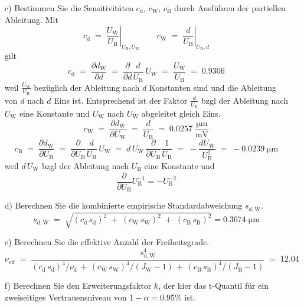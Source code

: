\begin{itemize}
\item[c)] Bestimmen Sie die Sensitivitäten $c_\mathrm{d}$, $c_\mathrm{W}$, $c_\mathrm{B}$ durch Ausführen der
partiellen Ableitung.
Mit 
\begin{equation*}
c_\mathrm{d} \; = \; \left. \frac{U_\mathrm{W}}{U_\mathrm{B}} \right|_{\bar U_\mathrm{B}, \bar U_\mathrm{W}} \qquad
c_\mathrm{W} \; = \; \left. \frac{d}{U_\mathrm{B}} \right|_{\bar U_\mathrm{B}, \bar d}
\end{equation*}
gilt
$$
c_\mathrm{d} \; = \; \frac{\partial d_\mathrm{W}}{\partial d}
\; = \; \frac{\partial}{\partial d} \frac{d}{U_\mathrm{B}} \, U_\mathrm{W}
\; = \; \frac{U_\mathrm{W}}{U_\mathrm{B}} \; =  \; 0.9306
$$
weil $\frac{U_\mathrm{W}}{U_\mathrm{B}}$ bezüglich der Ableitung nach $d$ Konstanten sind und die Ableitung von $d$
nach $d$ Eins ist. Entsprechend ist der Faktor $\frac{d}{U_\mathrm{B}}$ bzgl der Ableitung nach $U_\mathrm{W}$ eine
Konstante und $U_\mathrm{W}$ nach $U_\mathrm{W}$ abgeleitet gleich Eins.
$$
c_\mathrm{W} \; = \; \frac{\partial d_\mathrm{W}}{\partial U_\mathrm{W}} \; = \; \frac{d}{U_\mathrm{B}} \; = \;  0.0257 \; \frac{\mathrm{\mu m}}{\mathrm{mV}}
$$
$$
c_\mathrm{B} \; = \; \frac{\partial d_\mathrm{W}}{\partial U_\mathrm{B}}
\; = \; \frac{\partial}{\partial U_\mathrm{B}} \frac{d}{U_\mathrm{B}} \, U_\mathrm{W}
\; = \; d \, U_\mathrm{W} \, \frac{\partial}{\partial U_\mathrm{B}} \frac{1}{U_\mathrm{B}}
\; = \; -\frac{d U_\mathrm{W}}{U_\mathrm{B}^2} \; = \;  -0.0239 \; \mathrm{\mu m}
$$
weil $d \, U_\mathrm{W}$ bzgl der Ableitung nach $U_\mathrm{B}$ eine Konstante und
$$
 \frac{\partial}{\partial U_\mathrm{B}} U_\mathrm{B}^{-1} = -U_\mathrm{B}^{-2}
$$
\item[d)] Berechnen Sie die kombinierte empirische Standardabweichung $s_{d,\mathrm{W}}$.
$$
s_{\mathrm{d},\mathrm{W}} \; = \; \sqrt{(c_\mathrm{d} \, s_\mathrm{d})^2 \; + \; (c_\mathrm{W} \, s_\mathrm{W})^2 \; + \; (c_\mathrm{B} \, s_\mathrm{B})^2} =    0.3674 \; \mathrm{\mu m}
$$
\item[e)] Berechnen Sie die effektive Anzahl der Freiheitsgrade.
$$
\nu_\mathrm{eff} \; = \; \frac{s_{\mathrm{d},\mathrm{W}}^4}{(c_\mathrm{d} \, s_\mathrm{d})^4/\nu_\mathrm{d} \, + \, (c_\mathrm{W} \, s_\mathrm{W})^4/(J_\mathrm{W}-1) \, + \, (c_\mathrm{B} \, s_\mathrm{B})^4/(J_\mathrm{B}-1)} \; = \; 12.04
$$
\item[f)] Berechnen Sie den Erweiterungsfaktor $k$, der
 hier das t-Quantil für ein zweiseitiges Vertrauensniveau
 von $1-\alpha = 0.95\%$ ist.


\end{itemize}
